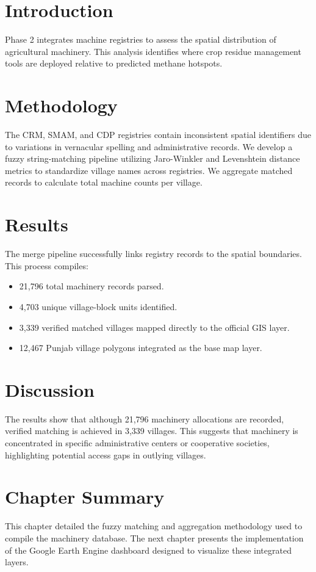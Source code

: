 \documentclass[12pt,a4paper]{report}
\begin{document}
\section{Introduction}
Phase 2 integrates machine registries to assess the spatial distribution of agricultural machinery. This analysis identifies where crop residue management tools are deployed relative to predicted methane hotspots.

\section{Methodology}
The CRM, SMAM, and CDP registries contain inconsistent spatial identifiers due to variations in vernacular spelling and administrative records. We develop a fuzzy string-matching pipeline utilizing Jaro-Winkler and Levenshtein distance metrics to standardize village names across registries. We aggregate matched records to calculate total machine counts per village.

\section{Results}
The merge pipeline successfully links registry records to the spatial boundaries. This process compiles:
\begin{itemize}
    \item 21,796 total machinery records parsed.
    \item 4,703 unique village-block units identified.
    \item 3,339 verified matched villages mapped directly to the official GIS layer.
    \item 12,467 Punjab village polygons integrated as the base map layer.
\end{itemize}

\section{Discussion}
The results show that although 21,796 machinery allocations are recorded, verified matching is achieved in 3,339 villages. This suggests that machinery is concentrated in specific administrative centers or cooperative societies, highlighting potential access gaps in outlying villages.

\section{Chapter Summary}
This chapter detailed the fuzzy matching and aggregation methodology used to compile the machinery database. The next chapter presents the implementation of the Google Earth Engine dashboard designed to visualize these integrated layers.
\end{document}
